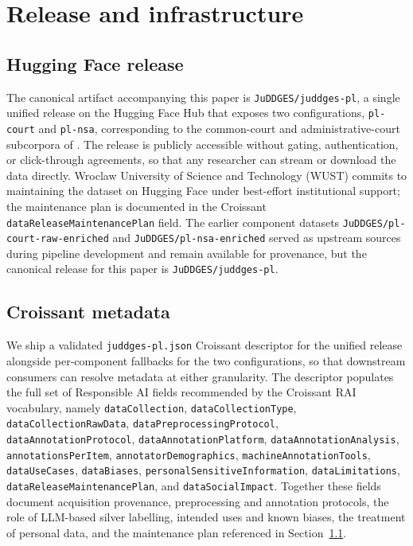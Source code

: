 
\section{Release and infrastructure}
\label{sec:release}

\subsection{Hugging Face release}
\label{sec:release:hf}

The canonical artifact accompanying this paper is \texttt{JuDDGES/juddges-pl}, a single unified release on the Hugging Face Hub that exposes two configurations, \texttt{pl-court} and \texttt{pl-nsa}, corresponding to the common-court and administrative-court subcorpora of \juddgespl{}. The release is publicly accessible without gating, authentication, or click-through agreements, so that any researcher can stream or download the data directly. Wroclaw University of Science and Technology (WUST) commits to maintaining the dataset on Hugging Face under best-effort institutional support; the maintenance plan is documented in the Croissant \texttt{dataReleaseMaintenancePlan} field. The earlier component datasets \texttt{JuDDGES/pl-court-raw-enriched} and \texttt{JuDDGES/pl-nsa-enriched} served as upstream sources during pipeline development and remain available for provenance, but the canonical release for this paper is \texttt{JuDDGES/juddges-pl}.

\subsection{Croissant metadata}
\label{sec:release:croissant}

We ship a validated \texttt{juddges-pl.json} Croissant descriptor for the unified release alongside per-component fallbacks for the two configurations, so that downstream consumers can resolve metadata at either granularity. The descriptor populates the full set of Responsible AI fields recommended by the Croissant RAI vocabulary, namely \texttt{dataCollection}, \texttt{dataCollectionType}, \texttt{dataCollectionRawData}, \texttt{dataPreprocessingProtocol}, \texttt{dataAnnotationProtocol}, \texttt{dataAnnotationPlatform}, \texttt{dataAnnotationAnalysis}, \texttt{annotationsPerItem}, \texttt{annotatorDemographics}, \texttt{machineAnnotationTools}, \texttt{dataUseCases}, \texttt{dataBiases}, \texttt{personalSensitiveInformation}, \texttt{dataLimitations}, \texttt{dataReleaseMaintenancePlan}, and \texttt{dataSocialImpact}. Together these fields document acquisition provenance, preprocessing and annotation protocols, the role of LLM-based silver labelling, intended uses and known biases, the treatment of personal data, and the maintenance plan referenced in Section~\ref{sec:release:hf}.

